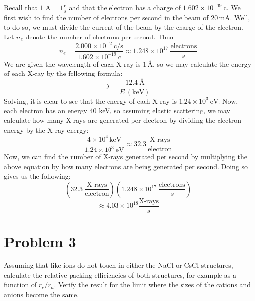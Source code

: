 \documentclass{article}
\begin{document}
Recall that $1 \text{ A} = 1 \frac{\text{c}}{s}$ and that the electron has a charge of $1.602 \times 10^{-19} \: \text{c}$. We first wish to find the number of electrons per second in the beam of $20 \: \text{mA}$. Well, to do so, we must divide the current of the beam by the charge of the electron. Let $n_e$ denote the number of electrons per second. Then
\[n_e = \frac{2.000 \times 10^{-2} \: \text{c/s}}{1.602 \times 10^{-19} \: \text{c}} \approx 1.248 \times 10^{17} \: \frac{\text{electrons}}{s}\]
We are given the wavelength of each X-ray is $1 \: \text{\AA}$, so we may calculate the energy of each X-ray by the following formula:
\[\lambda = \frac{12.4 \: \text{\AA}}{E \: (\text{keV})}\]
Solving, it is clear to see that the energy of each X-ray is $1.24 \times 10^3 \: \text{eV}$. Now, each electron has an energy 40 keV, so assuming elastic scattering, we may calculate how many X-rays are generated per electron by dividing the electron energy by the X-ray energy:
\[\frac{4 \times 10^4 \: \text{keV}}{1.24 \times 10^3 \: \text{eV}} \approx 32.3 \: \frac{\text{X-rays}}{\text{electron}}\]
Now, we can find the number of X-rays generated per second by multiplying the above equation by how many electrons are being generated per second. Doing so gives us the following:
\[\left(32.3 \: \frac{\text{X-rays}}{\text{electron}}\right)\left(1.248 \times 10^{17} \: \frac{\text{electrons}}{s}\right)\]
\[ \approx 4.03 \times 10^{18} \frac{\text{X-rays}}{s}\]



\section*{Problem 3}

Assuming that like ions do not touch in either the NaCl or CsCl structures, calculate the relative packing efficiencies of both structures, for example as a function of $r_c/r_a$. Verify the result for the limit where the sizes of the cations and anions become the same.
\newline
\end{document}
